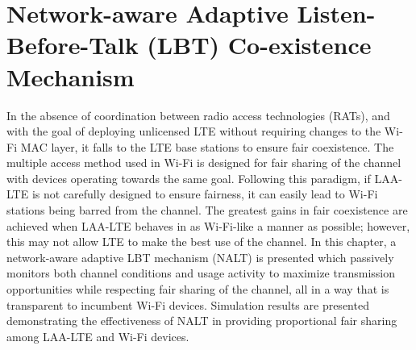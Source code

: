 %
%
%


\chapter{Network-aware Adaptive Listen-Before-Talk (LBT) Co-existence Mechanism}
\label{intro-NALT} %



In the absence of coordination between radio access technologies (RATs), and with the goal of deploying unlicensed LTE without requiring changes to the \mbox{Wi-Fi} MAC layer, it falls to the LTE base stations to ensure fair coexistence. The multiple access method used in \mbox{Wi-Fi} is designed for fair sharing of the channel with devices operating towards the same goal. Following this paradigm, if \mbox{LAA-LTE} is not carefully designed to ensure fairness, it can easily lead to \mbox{Wi-Fi} stations being barred from the channel. The greatest gains in fair coexistence are achieved when \mbox{LAA-LTE} behaves in as \mbox{Wi-Fi}-like a manner as possible; however, this may not allow LTE to make the best use of the channel.  In this chapter, a network-aware adaptive LBT mechanism (NALT) is presented which passively monitors both channel conditions and usage activity to maximize transmission opportunities while respecting fair sharing of the channel, all in a way that is transparent to incumbent \mbox{Wi-Fi} devices. Simulation results are presented demonstrating the effectiveness of NALT in providing proportional fair sharing among \mbox{LAA-LTE} and \mbox{Wi-Fi} devices.

